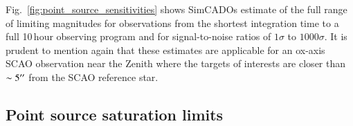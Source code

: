 Fig.~\ref{fig:point_source_sensitivities} shows SimCADOs estimate of the full range of limiting magnitudes for observations from the shortest integration time to a full 10\,hour observing program and for signal-to-noise ratios of $1\sigma$ to $1000\sigma$. It is prudent to mention again that these estimates are applicable for an ox-axis SCAO observation near the Zenith where the targets of interests are closer than $\sim5^{\prime\prime}$ from the SCAO reference star.


\subsection{Point source saturation limits}

